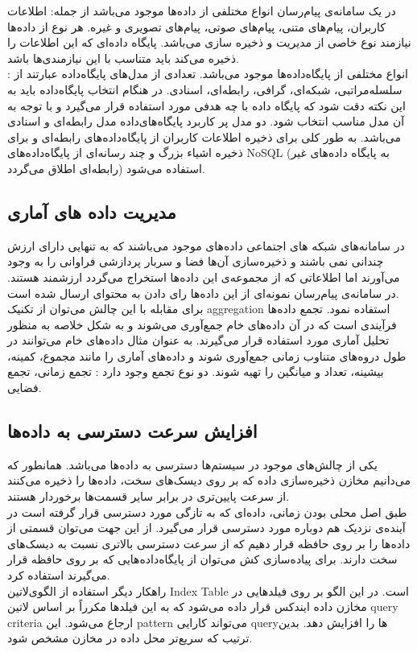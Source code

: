 در یک سامانه‌ی پیام‌رسان انواع مختلفی از داده‌ها موجود می‌باشد از جمله: اطلاعات کاربران، پیام‌های متنی، پیام‌های صوتی، پیام‌های تصویری و غیره. هر نوع از داده‌ها نیازمند نوع خاصی از مدیریت و ذخیره سازی می‌باشد. پایگاه داده‌ای که این اطلاعات را ذخیره می‌کند باید متناسب با این نیازمندی‌ها باشد.\\
انواع مختلفی از پایگاه‌داده‌ها موجود می‌باشد. تعدادی از مدل‌های پایگاه‌داده عبارتند از : سلسله‌مراتبی، شبکه‌ای، گرافی، رابطه‌ای، اسنادی. در هنگام انتخاب پایگاه‌داده باید به این نکته دقت شود که پایگاه‌ داده با چه هدفی مورد استفاده قرار می‌گیرد و با توجه به آن مدل مناسب انتخاب شود. دو مدل پر کاربرد پایگاه‌های‌داده مدل رابطه‌ای و اسنادی می‌باشد. به طور کلی برای ذخیره اطلاعات کاربران از پایگاه‌داده‌های رابطه‌ای و برای ذخیره اشیاء بزرگ و چند رسانه‌ای از پایگاه‌داده‌های NoSQL (به پایگاه داده‌های غیر رابطه‌ای اطلاق می‌گردد) استفاده می‌شود.

\subsection{مدیریت داده های آماری}
در سامانه‌های شبکه های اجتماعی داده‌های موجود می‌باشند که به تنهایی دارای ارزش چندانی نمی باشند و ذخیره‌سازی آن‌ها فضا و سربار پردازشی فراوانی را به وجود می‌آورند اما اطلاعاتی که از مجموعه‌ی این داده‌ها استخراج می‌گردد ارزشمند هستند. در سامانه‌ی پیام‌رسان نمونه‌ای از این داده‌ها رای دادن به محتوای ارسال شده است.\\ 
برای مقابله با این چالش می‌توان از تکنیک aggregation استفاده نمود. تجمع داده‌ها فرآیندی است که در آن داده‌های خام جمع‌آوری می‌شوند و به شکل خلاصه به منظور تحلیل آماری مورد استفاده قرار می‌گیرند. به عنوان مثال داده‌های خام می‌توانند در طول دروه‌های متناوب زمانی جمع‌آوری شوند و داده‌های آماری را مانند مجموع، کمینه، بیشینه، تعداد و میانگین را تهیه شوند. دو نوع تجمع وجود دارد : تجمع زمانی، تجمع فضایی.
\subsection{افزایش سرعت دسترسی به داده‌ها}
یکی از چالش‌های موجود در سیستم‌ها دسترسی به داده‌ها می‌باشد. همانطور که می‌دانیم مخازن ذخیره‌سازی داده که بر روی دیسک‌های سخت، داده‌ها را ذخیره می‌کنند از سرعت پایین‌تری در برابر سایر قسمت‌ها برخوردار هستند.\\
طبق اصل محلی بودن زمانی، داده‌ای که به تازگی مورد دسترسی قرار گرفته است در آینده‌ی نزدیک هم دوباره مورد دسترسی قرار می‌گیرد. از این جهت می‌توان قسمتی از داده‌ها را بر روی حافظه قرار دهیم که از سرعت دسترسی بالاتری نسبت به دیسک‌های سخت دارند. برای پیاده‌سازی کش می‌توان از پایگاه‌داده‌هایی که بر روی حافظه قرار می‌گیرند استفاده کرد. \\
راهکار دیگر استفاده از الگوی‌لاتین{ Index Table }است. در این الگو بر روی فیلدهایی در مخازن داده ایندکس قرار داده می‌شود که به این فیلد‌ها مکرراً بر اساس ‌لاتین{ query criteria  } ارجاع می‌شود. این pattern می‌تواند کارایی query‌ها را افزایش دهد. بدین ترتیب که سریع‌تر محل داده در مخازن مشخص شود.

